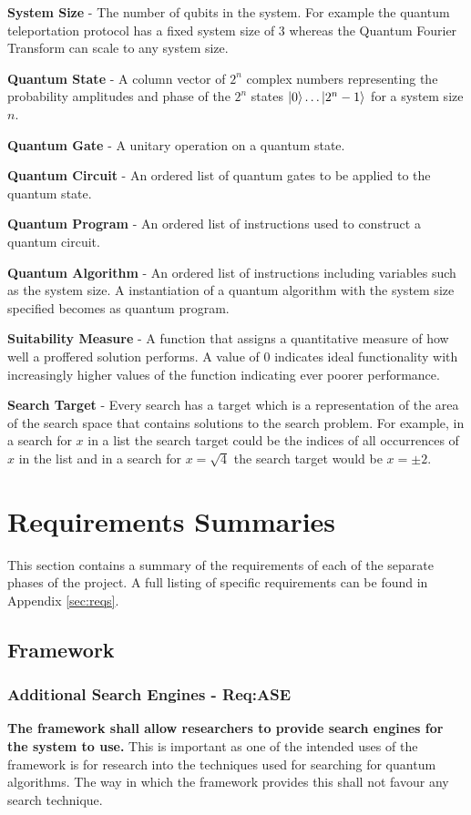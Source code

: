 \textbf{System Size} - The number of qubits in the system. For example the quantum teleportation protocol has a fixed system size of 3 whereas the Quantum Fourier Transform can scale to any system size.

\textbf{Quantum State} - A column vector of $2^n$ complex numbers representing the probability amplitudes and phase of the $2^n$ states $\left\vert{0}\right\rangle\dots\left\vert{2^n-1}\right\rangle$ for a system size $n$.

\textbf{Quantum Gate} - A unitary operation on a quantum state.

\textbf{Quantum Circuit} - An ordered list of quantum gates to be applied to the quantum state.

\textbf{Quantum Program} - An ordered list of instructions used to construct a quantum circuit.

\textbf{Quantum Algorithm} - An ordered list of instructions including variables such as the system size.
A instantiation of a quantum algorithm with the system size specified becomes as quantum program.

\textbf{Suitability Measure} - A function that assigns a quantitative measure of how well a proffered solution performs.
A value of $0$ indicates ideal functionality with increasingly higher values of the function indicating ever poorer performance.

\textbf{Search Target} - Every search has a target which is a representation of the area of the search space that contains solutions to the search problem.
For example, in a search for $x$ in a list the search target could be the indices of all occurrences of $x$ in the list and in a search for $x=\sqrt{4}$ the search target would be $x=\pm2$.

\section{Requirements Summaries}
This section contains a summary of the requirements of each of the separate phases of the project.
A full listing of specific requirements can be found in Appendix \ref{sec:reqs}.

\subsection{Framework}
\subsubsection{Additional Search Engines - Req:ASE}
\label{sec:reqase}
\textbf{The framework shall allow researchers to provide search engines for the system to use.}
This is important as one of the intended uses of the framework is for research into the techniques used for searching for quantum algorithms.
The way in which the framework provides this shall not favour any search technique.

